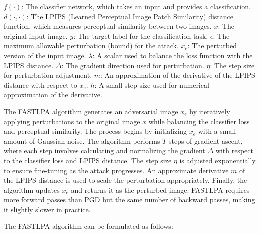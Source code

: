 $f(\cdot)$: The classifier network, which takes an input and provides a classification.
$d(\cdot, \cdot)$: The LPIPS (Learned Perceptual Image Patch Similarity) distance function, which measures perceptual similarity between two images.
$x$: The original input image.
$y$: The target label for the classification task.
$\epsilon$: The maximum allowable perturbation (bound) for the attack.
$x_e$: The perturbed version of the input image.
$\lambda$: A scalar used to balance the loss function with the LPIPS distance.
$\Delta$: The gradient direction used for perturbation.
$\eta$: The step size for perturbation adjustment.
$m$: An approximation of the derivative of the LPIPS distance with respect to $x_e$.
$h$: A small step size used for numerical approximation of the derivative.

The FASTLPA algorithm generates an adversarial image $x_e$ by iteratively applying perturbations to the original image $x$ while balancing the classifier loss and perceptual similarity. The process begins by initializing $x_e$ with a small amount of Gaussian noise. The algorithm performs $T$ steps of gradient ascent, where each step involves calculating and normalizing the gradient $\Delta$ with respect to the classifier loss and LPIPS distance. The step size $\eta$ is adjusted exponentially to ensure fine-tuning as the attack progresses. An approximate derivative $m$ of the LPIPS distance is used to scale the perturbation appropriately. Finally, the algorithm updates $x_e$ and returns it as the perturbed image. FASTLPA requires more forward passes than PGD but the same number of backward passes, making it slightly slower in practice. 

The FASTLPA algorithm can be formulated as follows:

